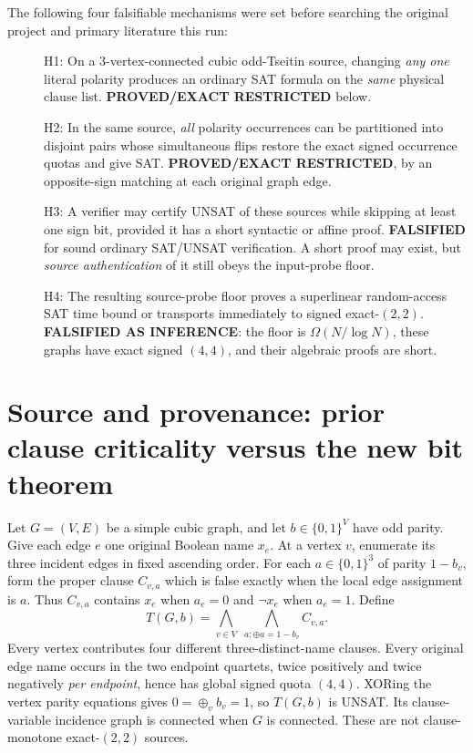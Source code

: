 \documentclass[11pt]{article}
\begin{document}
The following four falsifiable mechanisms were set before searching the original project and primary literature this run:
\begin{description}
\item[] H1: On a 3-vertex-connected cubic odd-Tseitin source, changing \emph{any one} literal polarity produces an ordinary SAT formula on the \emph{same} physical clause list. \textbf{PROVED/EXACT RESTRICTED} below.
\item[] H2: In the same source, \emph{all} polarity occurrences can be partitioned into disjoint pairs whose simultaneous flips restore the exact signed occurrence quotas and give SAT. \textbf{PROVED/EXACT RESTRICTED}, by an opposite-sign matching at each original graph edge.
\item[] H3: A verifier may certify UNSAT of these sources while skipping at least one sign bit, provided it has a short syntactic or affine proof. \textbf{FALSIFIED} for sound ordinary SAT/UNSAT verification. A short proof may exist, but \emph{source authentication} of it still obeys the input-probe floor.
\item[] H4: The resulting source-probe floor proves a superlinear random-access SAT time bound or transports immediately to signed exact-$(2,2)$. \textbf{FALSIFIED AS INFERENCE}: the floor is $\Omega(N/\log N)$, these graphs have exact signed $(4,4)$, and their algebraic proofs are short.
\end{description}

\section{Source and provenance: prior clause criticality versus the new bit theorem}
Let $G=(V,E)$ be a simple cubic graph, and let $b\in\{0,1\}^V$ have odd parity. Give each edge $e$ one original Boolean name $x_e$. At a vertex $v$, enumerate its three incident edges in fixed ascending order. For each $a\in\{0,1\}^3$ of parity $1-b_v$, form the proper clause $C_{v,a}$ which is false exactly when the local edge assignment is $a$. Thus $C_{v,a}$ contains $x_e$ when $a_e=0$ and $\neg x_e$ when $a_e=1$. Define
\[
T(G,b)=\bigwedge_{v\in V}\;\bigwedge_{a:\oplus a=1-b_v}C_{v,a}.
\tag{1}
\]
Every vertex contributes four different three-distinct-name clauses. Every original edge name occurs in the two endpoint quartets, twice positively and twice negatively \emph{per endpoint}, hence has global signed quota $(4,4)$. XORing the vertex parity equations gives $0=\oplus_v b_v=1$, so $T(G,b)$ is UNSAT. Its clause-variable incidence graph is connected when $G$ is connected. These are not clause-monotone exact-$(2,2)$ sources.
\end{document}
